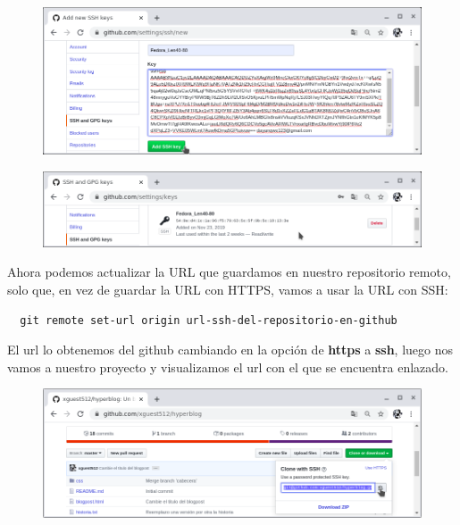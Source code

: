 \documentclass{article}
\begin{document}
\newpage

\begin{figure}[h!]
  \centering
  \includegraphics[scale=0.75]{./Pictures/225_new_ssh_key.png}
\end{figure}

\begin{figure}[h!]
  \centering
  \includegraphics[scale=0.75]{./Pictures/226_ssh_key_ok.png}
\end{figure}

Ahora podemos actualizar la URL que guardamos en nuestro repositorio remoto,
solo que, en vez de guardar la URL con HTTPS, vamos a usar la URL con SSH:\\

\begin{verbatim}
  git remote set-url origin url-ssh-del-repositorio-en-github
\end{verbatim}


El url lo obtenemos del github cambiando en la opción de \textbf{https} a
\textbf{ssh}, luego nos vamos a nuestro proyecto y visualizamos el url con el
que se encuentra enlazado.

\begin{figure}[h!]
  \centering
  \includegraphics[scale=0.75]{./Pictures/228_ssh_link.png}
\end{figure}
\end{document}
